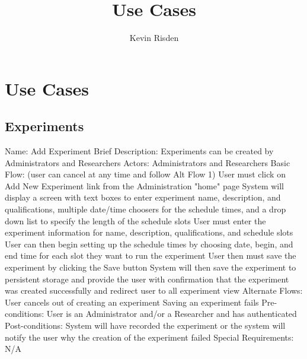 \documentclass[]{article}
\title{Use Cases}
\author{Kevin Risden}
\begin{document}
\maketitle
\section{Use Cases}
\subsection{Experiments}
\begin{outline}[enumerate]
\1 Name: Add Experiment
\2 Brief Description: Experiments can be created by Administrators and Researchers
\2 Actors: Administrators and Researchers
\2 Basic Flow: (user can cancel at any time and follow Alt Flow 1)
\3 User must click on Add New Experiment link from the Administration "home" page
\3 System will display a screen with text boxes to enter experiment name, description,  and qualifications, multiple date/time choosers for the schedule times, and a drop down list to specify the length of the schedule slots
\3 User must enter the experiment information for name, description, qualifications, and schedule slots
\3 User can then begin setting up the schedule times by choosing date, begin, and end time for each slot they want to run the experiment
\3 User then must save the experiment by clicking the Save button
\3 System will then save the experiment to persistent storage and provide the user with confirmation that the experiment was created successfully and redirect user to all experiment view
\2 Alternate Flows:
\3 User cancels out of creating an experiment
\3 Saving an experiment fails
\2 Pre-conditions:
\3 User is an Administrator and/or a Researcher and has authenticated
\2 Post-conditions:
\3 System will have recorded the experiment or the system will notify the user why the creation of the experiment failed
\2 Special Requirements:
\3 N/A


\end{outline}
\end{document}
